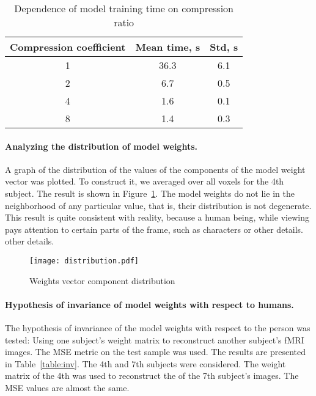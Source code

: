 \documentclass{article}
\begin{document}
\begin{table}[h!]
	\centering
	\caption{Dependence of model training time on compression ratio}
	\begin{tabular}{|c|c|c|}
		\hline
		Compression coefficient & Mean time, s & Std, s \\ \hline \hline
		1 & 36.3 & 6.1 \\ \hline
		2 & 6.7 & 0.5 \\ \hline
		4 & 1.6 & 0.1 \\ \hline
		8 & 1.4 & 0.3 \\ \hline
	\end{tabular}
	\label{table:coeffs}
\end{table}

\paragraph*{Analyzing the distribution of model weights.}

A graph of the distribution of the values of the components of the model weight vector was plotted.
To construct it, we averaged over all voxels for the 4th subject.
The result is shown in Figure~\ref{fig:w-distr}.
The model weights do not lie in the neighborhood of any particular value, 
that is, their distribution is not degenerate.
This result is quite consistent with reality, because a human being, while viewing
pays attention to certain parts of the frame, such as characters or other details.
other details.

\begin{figure}[h!]
	\centering
	\texttt{[image: distribution.pdf]}
	\caption{Weights vector component distribution}
	\label{fig:w-distr}
\end{figure}

\paragraph*{Hypothesis of invariance of model weights with respect to humans.}

The hypothesis of invariance of the model weights with respect to the person was tested:
Using one subject's weight matrix to reconstruct another subject's fMRI images.
The MSE metric on the test sample was used.
The results are presented in Table~\ref{table:inv}.
The 4th and 7th subjects were considered. The weight matrix of the 4th was used to reconstruct the
of the 7th subject's images.
The MSE values are almost the same.
\end{document}
